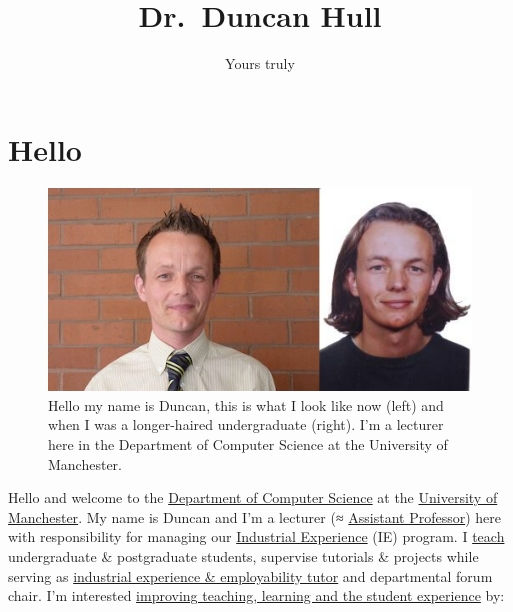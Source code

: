 \documentclass[
  12pt,
]{book}
\title{Dr.~Duncan Hull}
\author{Yours truly}
\date{}
\begin{document}
\maketitle

{
\setcounter{tocdepth}{1}
\tableofcontents
}
\hypertarget{hello}{%
\chapter*{Hello}\label{hello}}

\begin{figure}

{\centering \includegraphics[width=0.66\linewidth]{images/duncan_hull} 

}

\caption{Hello my name is Duncan, this is what I look like now (left) and when I was a longer-haired undergraduate (right). I'm a lecturer here in the Department of Computer Science at the University of Manchester.}\label{fig:unsplashed-fig}
\end{figure}

Hello and welcome to the \href{https://www.cs.manchester.ac.uk/}{Department of Computer Science} at the \href{https://www.manchester.ac.uk}{University of Manchester}. My name is Duncan and I'm a lecturer (≈ \href{https://en.wikipedia.org/wiki/Assistant_professor}{Assistant Professor}) here with responsibility for managing our \href{https://www.cs.manchester.ac.uk/study/undergraduate/industrial-experience/}{Industrial Experience} (IE) program. I \href{https://personalpages.manchester.ac.uk/staff/duncan.hull/teaching.html}{teach} undergraduate \& postgraduate students, supervise tutorials \& projects while serving as \href{http://studentnet.cs.manchester.ac.uk/employment/placement/}{industrial experience \& employability tutor} and departmental forum chair. I'm interested \href{https://personalpages.manchester.ac.uk/staff/duncan.hull/research.html}{improving teaching, learning and the student experience} by:
\end{document}
